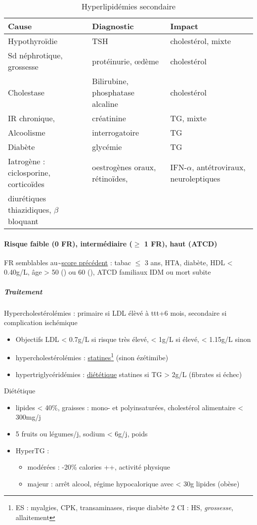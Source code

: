 \documentclass[11pt]{article}
\begin{document}
\begin{table}[htbp]
\caption{\label{tab:org4855194}Hyperlipidémies secondaire}
\centering
\begin{tabular}{lll}
Cause & Diagnostic & Impact\\
\hline
Hypothyroïdie & TSH & cholestérol, mixte\\
Sd néphrotique, grossesse & protéinurie, \oe{}dème & cholestérol\\
Cholestase & Bilirubine, phosphatase alcaline & cholestérol\\
IR chronique, & créatinine & TG, mixte\\
Alcoolisme & interrogatoire & TG\\
Diabète & glycémie & TG\\
\hline
Iatrogène : ciclosporine, corticoïdes & oestrogènes oraux, rétinoïdes, & IFN-\(\alpha\), antétroviraux, neuroleptiques\\
diurétiques thiazidiques, \(\beta\)bloquant &  & \\
\end{tabular}
\end{table}

\paragraph{Risque faible (0 FR), intermédiaire (\(\ge\) 1 FR), haut (ATCD)}
\label{sec:org74f9106}

FR semblables au\textasciitilde{}\hyperref[subsec:fr]{score précédent} : tabac \(\le\) 3 ans, HTA, diabète, HDL < 0.40g/L, âge > 50
(\male) ou 60 (\female), ATCD familiaux IDM ou mort subite

\subparagraph{Traitement}
\label{sec:org15a8837}
Hypercholestérolémies : primaire si LDL élèvé à ttt+6 mois, secondaire si complication ischémique
\begin{itemize}
\item Objectifs LDL < 0.7g/L si risque très élevé, < 1g/L si élevé, < 1.15g/L sinon
\item hypercholestérolémies : \uline{statines}\footnote{ES : myalgies, \inc CPK, \inc transaminases, \inc risque diabète 2
CI : HS, \emph{grossesse}, allaitement} (sinon ézétimibe)
\item hypertriglycéridémies : \uline{diététique} \textpm{} statines si TG > 2g/L (fibrates si échec)
\end{itemize}

Diététique
\begin{itemize}
\item lipides < 40\%, graisses : mono- et polyinsaturées, cholestérol alimentaire < 300mg/j
\item 5 fruits ou légumes/j, sodium < 6g/j, \dec poids
\item HyperTG : 
\begin{itemize}
\item modérées : -20\% calories ++, \inc activité physique
\item majeur : arrêt alcool, régime hypocalorique avec < 30g lipides (obèse)
\end{itemize}
\end{itemize}
\end{document}
